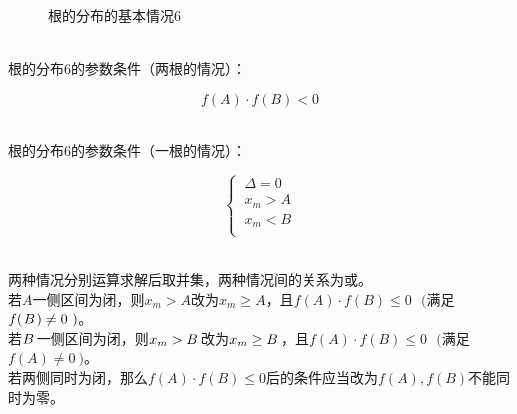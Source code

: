 \documentclass[UTF8]{ctexart}
\begin{document}
\begin{figure}[h]
\begin{center}
{
            }
        \caption{根的分布的基本情况$6$}
        \end{center}
    \end{figure}\\
    根的分布$6$的参数条件（两根的情况）：
    \begin{large}
        \begin{equation*}
            f(A)\cdot f(B) <0
        \end{equation*}
    \end{large}\\
    根的分布$6$的参数条件（一根的情况）：
    \begin{large}
        \begin{equation*}
            \begin{cases}
                ~\Delta=0\\[1mm]
                ~x_m>A\\[1mm]
                ~x_m<B\\[1mm]
            \end{cases}
        \end{equation*}
    \end{large}\\
    两种情况分别运算求解后取并集，两种情况间的关系为或。\\[3mm]
    若$A$一侧区间为闭，则$x_m>A$改为$x_m\geq A$，且$f(A)\cdot f(B)\leq 0~~~($满足$f(\hspace{1.0pt}B\hspace{1.0pt})\neq 0~)$。\\[3mm]
    若$B\hspace{1.5pt}$一侧区间为闭，则$x_m>B\hspace{1.5pt}$改为$x_m\geq B\hspace{1.5pt}$，且$f(A)\cdot f(B)\leq 0~~~($满足$f(A)\neq 0~)$。\\[3mm]
    若两侧同时为闭，那么$f(A)\cdot f(B)\leq 0$后的条件应当改为$f(A),f(B)$不能同时为零。
\end{document}
